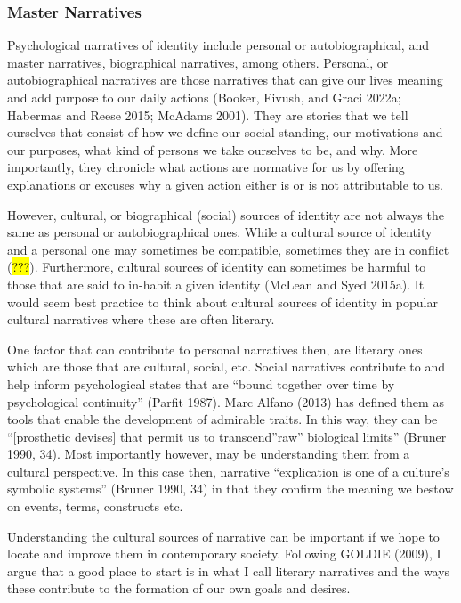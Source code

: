 \documentclass[
  letterpaper,
  DIV=11,
  numbers=noendperiod]{scrartcl}
\theoremstyle{remark}
\begin{document}
\subsubsection{Master Narratives}\label{master-narratives}

Psychological narratives of identity include personal or
autobiographical, and master narratives, biographical narratives, among
others. Personal, or autobiographical narratives are those narratives
that can give our lives meaning and add purpose to our daily actions
(Booker, Fivush, and Graci 2022a; Habermas and Reese 2015; McAdams
2001). They are stories that we tell ourselves that consist of how we
define our social standing, our motivations and our purposes, what kind
of persons we take ourselves to be, and why. More importantly, they
chronicle what actions are normative for us by offering explanations or
excuses why a given action either is or is not attributable to us.

However, cultural, or biographical (social) sources of identity are not
always the same as personal or autobiographical ones. While a cultural
source of identity and a personal one may sometimes be compatible,
sometimes they are in conflict (\hl{???}). Furthermore, cultural sources
of identity can sometimes be harmful to those that are said to in-habit
a given identity (McLean and Syed 2015a). It would seem best practice to
think about cultural sources of identity in popular cultural narratives
where these are often literary.

One factor that can contribute to personal narratives then, are literary
ones which are those that are cultural, social, etc. Social narratives
contribute to and help inform psychological states that are ``bound
together over time by psychological continuity'' (Parfit 1987). Marc
Alfano (2013) has defined them as tools that enable the development of
admirable traits. In this way, they can be ``{[}prosthetic devises{]}
that permit us to transcend''raw'' biological limits'' (Bruner 1990,
34). Most importantly however, may be understanding them from a cultural
perspective. In this case then, narrative ``explication is one of a
culture's symbolic systems'' (Bruner 1990, 34) in that they confirm the
meaning we bestow on events, terms, constructs etc.

Understanding the cultural sources of narrative can be important if we
hope to locate and improve them in contemporary society. Following
GOLDIE (2009), I argue that a good place to start is in what I call
literary narratives and the ways these contribute to the formation of
our own goals and desires.
\end{document}

